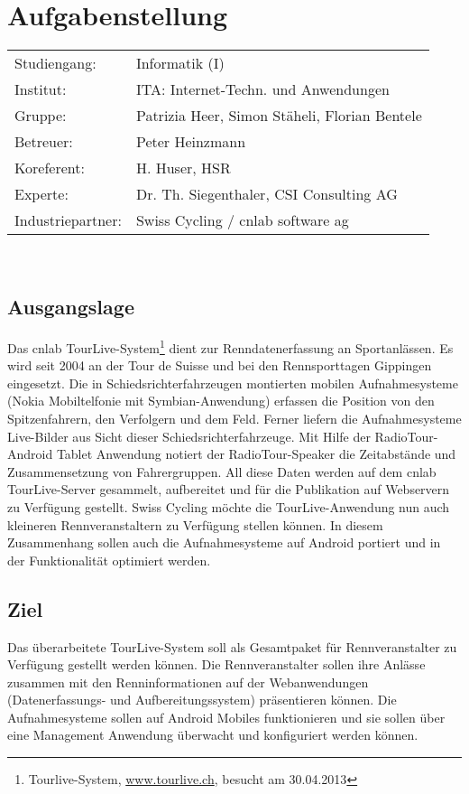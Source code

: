 \chapter*{Aufgabenstellung}

\begin{tabular}{ll}
	Studiengang: & Informatik (I) \\
	Institut: & ITA: Internet-Techn. und Anwendungen \\
	Gruppe: & Patrizia Heer, Simon Stäheli, Florian Bentele \\
	Betreuer: & Peter Heinzmann  \\
	Koreferent: & H. Huser, HSR \\
	Experte: & Dr. Th. Siegenthaler, CSI Consulting AG  \\
	Industriepartner: & Swiss Cycling / cnlab software ag \\    
\end{tabular}
\\

\section*{Ausgangslage}
Das cnlab TourLive-System\footnote{Tourlive-System, \url{www.tourlive.ch}, besucht am 30.04.2013} dient zur Renndatenerfassung an Sportanlässen. Es wird seit 2004 an der Tour de Suisse und bei den Rennsporttagen Gippingen eingesetzt. Die in Schiedsrichterfahrzeugen montierten mobilen Aufnahmesysteme (Nokia Mobiltelfonie mit Symbian-Anwendung) erfassen die Position von den Spitzenfahrern, den Verfolgern und dem Feld. Ferner liefern die Aufnahmesysteme Live-Bilder aus Sicht dieser Schiedsrichterfahrzeuge. Mit Hilfe der RadioTour-Android Tablet Anwendung notiert der RadioTour-Speaker die Zeitabstände und Zusammensetzung von Fahrergruppen. All diese Daten werden auf dem cnlab TourLive-Server gesammelt, aufbereitet und für die Publikation auf Webservern zu Verfügung gestellt. 
Swiss Cycling möchte die TourLive-Anwendung nun auch kleineren Rennveranstaltern zu Verfügung stellen können. In diesem Zusammenhang sollen auch die Aufnahmesysteme auf Android portiert und in der Funktionalität optimiert werden.

\section*{Ziel}
Das überarbeitete TourLive-System soll als Gesamtpaket für Rennveranstalter zu Verfügung gestellt werden können. Die Rennveranstalter sollen ihre Anlässe zusammen mit den Renninformationen auf der Webanwendungen (Datenerfassungs- und Aufbereitungssystem) präsentieren können. Die Aufnahmesysteme sollen auf Android Mobiles funktionieren und sie sollen über eine Management Anwendung überwacht und konfiguriert werden können.

